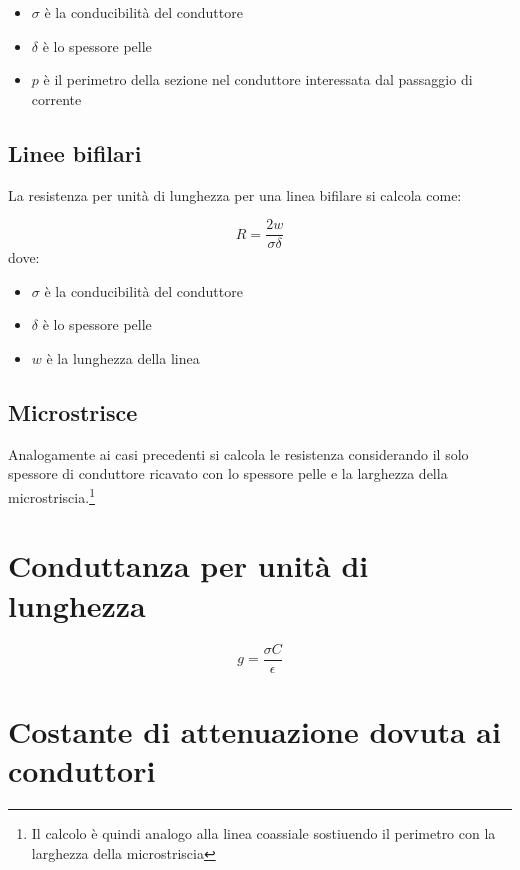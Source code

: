 \documentclass[10pt,a4paper]{report}
\begin{document}
			\begin{itemize}
			\item $\sigma$ è la conducibilità del conduttore
			\item $\delta$ è lo spessore pelle
			\item $p$ è il perimetro della sezione nel conduttore interessata dal passaggio di corrente
			\end{itemize}

		\subsection{Linee bifilari}

				La resistenza per unità di lunghezza per una linea bifilare si calcola come:

				\begin{equation}R=\frac{2w}{\sigma \delta}\end{equation}
				dove:
				
				\begin{itemize}
				\item $\sigma$ è la conducibilità del conduttore
				\item $\delta$ è lo spessore pelle
				\item $w$ è la lunghezza della linea
				\end{itemize}

		\subsection{Microstrisce}

			Analogamente ai casi precedenti si calcola le resistenza considerando il solo spessore di conduttore ricavato con lo spessore pelle e la larghezza della microstriscia.\footnote{Il calcolo è quindi analogo alla linea coassiale sostiuendo il perimetro con la larghezza della microstriscia}

	\section{Conduttanza per unità di lunghezza}

			\begin{equation}
			g=\frac{\sigma C}{\epsilon}
			\end{equation}





	\section{Costante di attenuazione dovuta ai conduttori}
	
\end{document}

